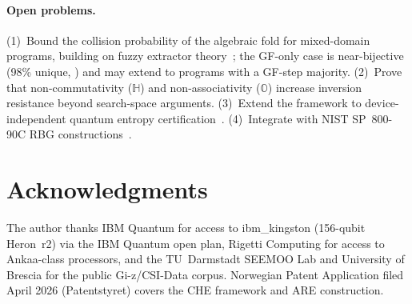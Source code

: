 \documentclass[conference,compsoc]{IEEEtran}
\begin{document}
\paragraph{Open problems.}
(1)~Bound the collision probability of the algebraic fold for
mixed-domain programs, building on fuzzy extractor
theory~\cite{dodis2008fuzzy}; the GF-only case is near-bijective
(98\% unique, ) and may extend to programs with
a GF-step majority.
(2)~Prove that non-commutativity ($\mathbb{H}$) and
non-associativity ($\mathbb{O}$) increase inversion resistance
beyond search-space arguments.
(3)~Extend the framework to device-independent quantum entropy
certification~\cite{aaronson2025certified}.
(4)~Integrate with NIST SP~800-90C RBG
constructions~\cite{nist2025sp80090c}.


\section*{Acknowledgments}
The author thanks IBM Quantum for access to ibm\_kingston (156-qubit Heron~r2) via the IBM Quantum open plan, Rigetti Computing for access to Ankaa-class processors, and the TU~Darmstadt SEEMOO Lab and University of Brescia for the public Gi-z/CSI-Data corpus. Norwegian Patent Application filed April 2026 (Patentstyret) covers the CHE framework and ARE construction.



\end{document}
